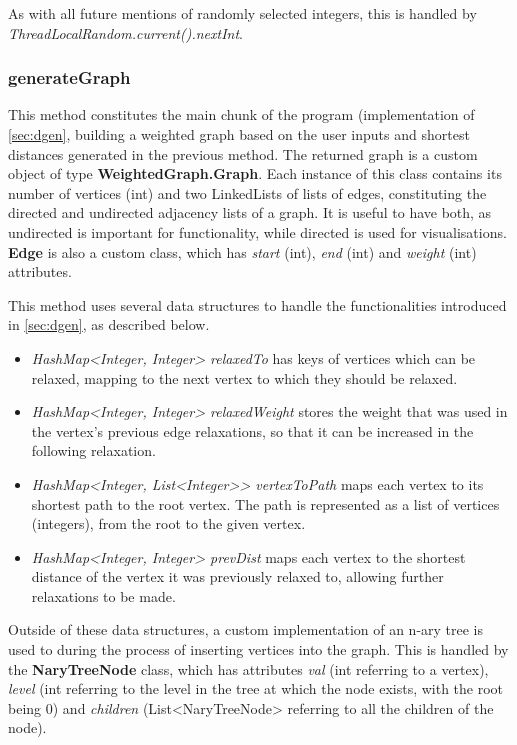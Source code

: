 \documentclass{l4proj}
\begin{document}
As with all future mentions of randomly selected integers, this is handled by \emph{ThreadLocalRandom.current().nextInt}.

\subsubsection{generateGraph}
\label{sec:generateGraph}

This method constitutes the main chunk of the program (implementation of \autoref{sec:dgen}, building a weighted graph based on the user inputs and shortest distances generated in the previous method. The returned graph is a custom object of type \textbf{WeightedGraph.Graph}. Each instance of this class contains its number of vertices (int) and two LinkedLists of lists of edges, constituting the directed and undirected adjacency lists of a graph. It is useful to have both, as undirected is important for functionality, while directed is used for visualisations. \textbf{Edge} is also a custom class, which has \emph{start} (int), \emph{end} (int) and \emph{weight} (int) attributes.

This method uses several data structures to handle the functionalities introduced in \autoref{sec:dgen}, as described below.
\begin{itemize}
	\item
	\emph{HashMap<Integer, Integer> relaxedTo} has keys of vertices which can be relaxed, mapping to the next vertex to which they should be relaxed.
	\item
	\emph{HashMap<Integer, Integer> relaxedWeight} stores the weight that was used in the vertex's previous edge relaxations, so that it can be increased in the following relaxation.
	\item
	\emph{HashMap<Integer, List<Integer>> vertexToPath} maps each vertex to its shortest path to the root vertex. The path is represented as a list of vertices (integers), from the root to the given vertex.
	\item
	\emph{HashMap<Integer, Integer> prevDist} maps each vertex to the shortest distance of the vertex it was previously relaxed to, allowing further relaxations to be made.
\end{itemize}

Outside of these data structures, a custom implementation of an n-ary tree is used to during the process of inserting vertices into the graph. This is handled by the \textbf{NaryTreeNode} class, which has attributes \emph{val} (int referring to a vertex), \emph{level} (int referring to the level in the tree at which the node exists, with the root being $0$) and \emph{children} (List<NaryTreeNode> referring to all the children of the node). 
\end{document}
